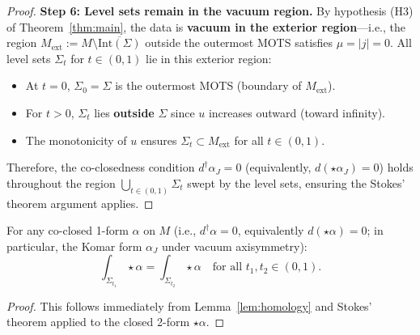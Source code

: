 \begin{proof}
\textbf{Step 6: Level sets remain in the vacuum region.}
By hypothesis (H3) of Theorem~\ref{thm:main}, the data is \textbf{vacuum in the exterior region}---i.e., the region $M_{\text{ext}} := M \setminus \overline{\text{Int}(\Sigma)}$ outside the outermost MOTS satisfies $\mu = |j| = 0$. All level sets $\Sigma_t$ for $t \in (0, 1)$ lie in this exterior region:
\begin{itemize}
    \item At $t = 0$, $\Sigma_0 = \Sigma$ is the outermost MOTS (boundary of $M_{\text{ext}}$).
    \item For $t > 0$, $\Sigma_t$ lies \textbf{outside} $\Sigma$ since $u$ increases outward (toward infinity).
    \item The monotonicity of $u$ ensures $\Sigma_t \subset M_{\text{ext}}$ for all $t \in (0, 1)$.
\end{itemize}
Therefore, the co-closedness condition $d^\dagger\alpha_J = 0$ (equivalently, $d(\star\alpha_J) = 0$) holds throughout the region $\bigcup_{t \in (0,1)} \Sigma_t$ swept by the level sets, ensuring the Stokes' theorem argument applies.
\end{proof}

\begin{corollary}\label{cor:komar-constancy}
For any co-closed 1-form $\alpha$ on $M$ (i.e., $d^\dagger\alpha = 0$, equivalently $d(\star\alpha) = 0$; in particular, the Komar form $\alpha_J$ under vacuum axisymmetry):
\[
\int_{\Sigma_{t_1}} \star\alpha = \int_{\Sigma_{t_2}} \star\alpha \quad \text{for all } t_1, t_2 \in (0, 1).
\]
\end{corollary}
\begin{proof}
This follows immediately from Lemma~\ref{lem:homology} and Stokes' theorem applied to the closed 2-form $\star\alpha$.
\end{proof}

\begin{center}
\end{center}

